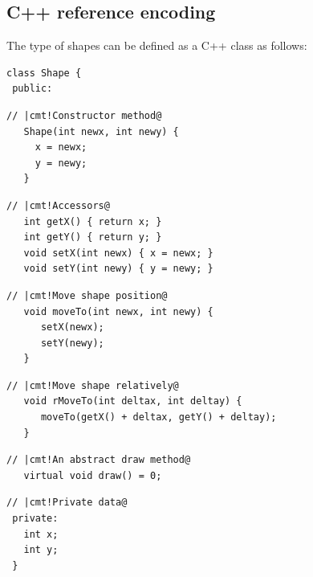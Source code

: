 \documentclass{jfp}
\begin{document}



\subsection{C++ reference encoding}

The type of shapes can be defined as a C++ class as follows:

\begin{Verbatim}[fontsize=\small,commandchars=\|\!\@]
 class Shape {
 public:
\end{Verbatim}

\begin{Verbatim}[fontsize=\small,commandchars=\|\!\@]
   // |cmt!Constructor method@
   Shape(int newx, int newy) {
     x = newx;
     y = newy;
   }
\end{Verbatim}

\begin{Verbatim}[fontsize=\small,commandchars=\|\!\@]
   // |cmt!Accessors@
   int getX() { return x; }
   int getY() { return y; }
   void setX(int newx) { x = newx; }
   void setY(int newy) { y = newy; }
\end{Verbatim}

\begin{Verbatim}[fontsize=\small,commandchars=\|\!\@]
   // |cmt!Move shape position@
   void moveTo(int newx, int newy) {
      setX(newx);
      setY(newy);
   }
\end{Verbatim}

\begin{Verbatim}[fontsize=\small,commandchars=\|\!\@]
   // |cmt!Move shape relatively@
   void rMoveTo(int deltax, int deltay) {
      moveTo(getX() + deltax, getY() + deltay);
   }
\end{Verbatim}

\begin{Verbatim}[fontsize=\small,commandchars=\|\!\@]
   // |cmt!An abstract draw method@
   virtual void draw() = 0;
\end{Verbatim}

\begin{Verbatim}[fontsize=\small,commandchars=\|\!\@]
 // |cmt!Private data@
 private:
   int x;
   int y;
 }
\end{Verbatim}
\end{document}
